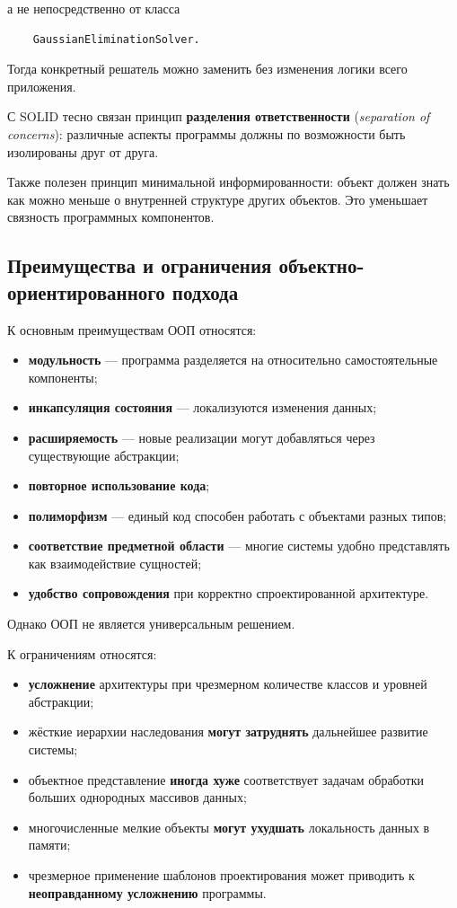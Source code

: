 а не непосредственно от класса
\begin{verbatim}
	GaussianEliminationSolver.
\end{verbatim}

Тогда конкретный решатель можно заменить без изменения логики всего приложения.

С SOLID тесно связан принцип \textbf{разделения ответственности} (\textit{separation of concerns}): различные аспекты программы должны по возможности быть изолированы друг от друга.

Также полезен принцип минимальной информированности: объект должен знать как можно меньше о внутренней структуре других объектов. Это уменьшает связность программных компонентов.

\subsection{Преимущества и ограничения объектно-ориентированного подхода}

К основным преимуществам ООП относятся:
\begin{itemize}
	\item \textbf{модульность} --- программа разделяется на относительно самостоятельные компоненты;
	\item \textbf{инкапсуляция состояния} --- локализуются изменения данных;
	\item \textbf{расширяемость} --- новые реализации могут добавляться через существующие абстракции;
	\item \textbf{повторное использование кода};
	\item \textbf{полиморфизм} --- единый код способен работать с объектами разных типов;
	\item \textbf{соответствие предметной области} --- многие системы удобно представлять как взаимодействие сущностей;
	\item \textbf{удобство сопровождения} при корректно спроектированной архитектуре.
\end{itemize}

Однако ООП не является универсальным решением.

К ограничениям относятся:
\begin{itemize}
	\item \textbf{усложнение} архитектуры при чрезмерном количестве классов и уровней абстракции;
	\item жёсткие иерархии наследования \textbf{могут затруднять} дальнейшее развитие системы;
	\item объектное представление \textbf{иногда хуже} соответствует задачам обработки больших однородных массивов данных;
	\item многочисленные мелкие объекты \textbf{могут ухудшать} локальность данных в памяти;
	\item чрезмерное применение шаблонов проектирования может приводить к \textbf{неоправданному усложнению} программы.
\end{itemize}

